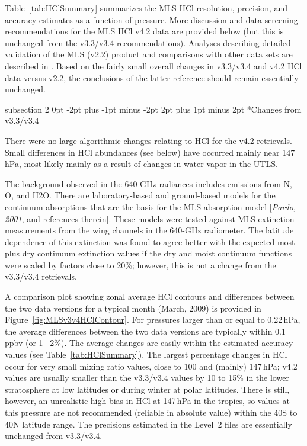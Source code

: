 \documentclass[11pt,draft]{report}
\makeatletter
\renewcommand{\subsection}{\@startsection%
  {subsection}%
  {2}%
  {0pt}%
  {-2pt plus -1pt minus -2pt}%
  {2pt plus 1pt minus 2pt}%
  {\large\sffamily\fontseries{sb}\selectfont\flushleft\color{SectionColor}\figureversion{tabular}}}%
\makeatother
\begin{document}
Table~\ref{tab:HClSummary} summarizes the MLS HCl resolution, precision,
and accuracy estimates as a function of pressure.  More discussion and
data screening recommendations for the MLS HCl v4.2 data are provided
below (but this is unchanged from the v3.3/v3.4 recommendations).
Analyses describing detailed validation of the MLS (v2.2) product and
comparisons with other data sets are described in
\citet{FroidevauxEtal08HCl}.  Based on the fairly small overall changes
in v3.3/v3.4 and v4.2 HCl data versus v2.2, the conclusions of the
latter reference should remain essentially unchanged.

\subsection*{Changes from  v3.3/v3.4}

There were no large algorithmic changes relating to HCl for the v4.2
retrievals. Small differences in HCl abundances (see below) have
occurred mainly near 147\,hPa, most likely mainly as a result of changes
in water vapor in the UTLS.

The background observed in the 640-GHz radiances includes emissions from
N, O, and H\cs2O.  There are laboratory-based and ground-based
models for the continuum absorptions that are the basis for the MLS
absorption model [{\it Pardo, 2001}, and references therein].  These
models were tested against MLS extinction measurements from the wing
channels in the 640-GHz radiometer.  The latitude dependence of this
extinction was found to agree better with the expected most plus dry
continuum extinction values if the dry and moist continuum functions
were scaled by factors close to 20\%; however, this is not a change
from the v3.3/v3.4 retrievals.

A comparison plot showing zonal average HCl contours and differences
between the two data versions for a typical month (March, 2009) is
provided in Figure~\ref{fig:MLSv3v4HClContour}.  For pressures larger
than or equal to 0.22\,hPa, the average differences between the two data
versions are typically within 0.1\,ppbv (or 1\,--\,2\%).  The average
changes are easily within the estimated accuracy values (see
Table~\ref{tab:HClSummary}).  The largest percentage changes in HCl
occur for very small mixing ratio values, close to 100 and (mainly)
147\,hPa; v4.2 values are usually smaller than the v3.3/v3.4 values by
10 to 15\% in the lower stratosphere at low latitudes or during winter
at polar latitudes.  There is still, however, an unrealistic high bias
in HCl at 147\,hPa in the tropics, so values at this pressure are not
recommended (reliable in absolute value) within the 40\degsym S to
40\degsym N latitude range. The precisions estimated in the Level~2
files are essentially unchanged from v3.3/v3.4.
\end{document}
